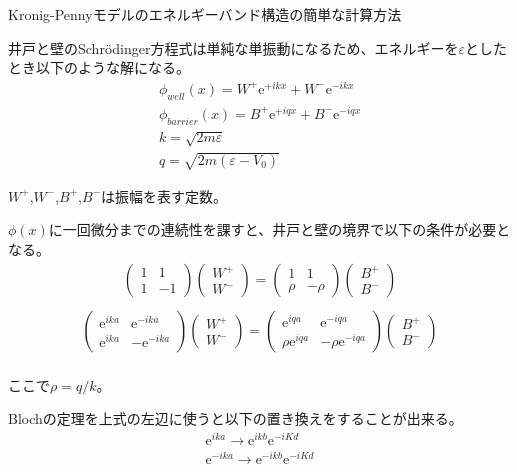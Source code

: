 \documentclass[a4paper, lualatex]{bxjsarticle}
\begin{document}
\begin{section}{Kronig-Pennyモデルのエネルギーバンド構造の簡単な計算方法}
    \par 井戸と壁のSchrödinger方程式は単純な単振動になるため、エネルギーを$\varepsilon$としたとき以下のような解になる。
    \begin{align}
     \phi_{well}(x)=W^+\mathrm{e}^{+ikx}+W^-\mathrm{e}^{-ikx}\nonumber\\
        \phi_{barrier}(x)=B^+\mathrm{e}^{+iqx}+B^-\mathrm{e}^{-iqx}\nonumber\\
        k=\sqrt{2m\varepsilon}\nonumber\\
        q=\sqrt{2m(\varepsilon - V_0)}
    \end{align}
    \par $W^+$,$W^-$,$B^+$,$B^-$は振幅を表す定数。
    \par $\phi(x)$に一回微分までの連続性を課すと、井戸と壁の境界で以下の条件が必要となる。
    \begin{align}
     \begin{pmatrix} 1 & 1 \\ 1 & -1 \end{pmatrix}\begin{pmatrix} W^{ + } \\ W^{ - } \end{pmatrix}=\begin{pmatrix} 1 & 1 \\ \rho & -\rho \end{pmatrix}\begin{pmatrix} B^{ + } \\ B^{ - } \end{pmatrix}\nonumber\\
    \end{align}
    \begin{align}
     \begin{pmatrix} \mathrm{e}^{ika} & \mathrm{e}^{-ika} \\ \mathrm{e}^{ika} & -\mathrm{e}^{-ika} \end{pmatrix}\begin{pmatrix} W^{+} \\ W^{-} \end{pmatrix}=\begin{pmatrix} \mathrm{e}^{iqa} & \mathrm{e}^{-iqa} \\ \rho\mathrm{e}^{iqa} & -\rho \mathrm{e}^{-iqa} \end{pmatrix}\begin{pmatrix} B^{+} \\ B^{-} \end{pmatrix}\nonumber\\
    \end{align}
    \par ここで$\rho=q/k$。
    \par Blochの定理を上式の左辺に使うと以下の置き換えをすることが出来る。
    \begin{align}
        \mathrm{e}^{ika}\rightarrow\mathrm{e}^{ikb}\mathrm{e}^{-iKd}\\
        \mathrm{e}^{-ika}\rightarrow\mathrm{e}^{-ikb}\mathrm{e}^{-iKd}
    \end{align}
    \end{section}
\end{document}
